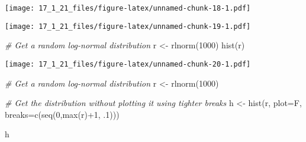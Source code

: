 \documentclass[
]{article}
\newenvironment{Shaded}{\begin{snugshade}}{\end{snugshade}}
\newcommand{\AttributeTok}[1]{\textcolor[rgb]{0.77,0.63,0.00}{#1}}
\newcommand{\CommentTok}[1]{\textcolor[rgb]{0.56,0.35,0.01}{\textit{#1}}}
\newcommand{\DecValTok}[1]{\textcolor[rgb]{0.00,0.00,0.81}{#1}}
\newcommand{\FloatTok}[1]{\textcolor[rgb]{0.00,0.00,0.81}{#1}}
\newcommand{\FunctionTok}[1]{\textcolor[rgb]{0.00,0.00,0.00}{#1}}
\newcommand{\NormalTok}[1]{#1}
\newcommand{\OtherTok}[1]{\textcolor[rgb]{0.56,0.35,0.01}{#1}}
\newcommand{\SpecialCharTok}[1]{\textcolor[rgb]{0.00,0.00,0.00}{#1}}
\newcommand{\StringTok}[1]{\textcolor[rgb]{0.31,0.60,0.02}{#1}}
\begin{document}
\texttt{[image: 17\_1\_21\_files/figure-latex/unnamed-chunk-18-1.pdf]}

\begin{Shaded}
\end{Shaded}

\texttt{[image: 17\_1\_21\_files/figure-latex/unnamed-chunk-19-1.pdf]}

\begin{Shaded}
\begin{Highlighting}[]
\CommentTok{\# Get a random log{-}normal distribution}
\NormalTok{r }\OtherTok{\textless{}{-}} \FunctionTok{rlnorm}\NormalTok{(}\DecValTok{1000}\NormalTok{)}
\FunctionTok{hist}\NormalTok{(r)}
\end{Highlighting}
\end{Shaded}

\texttt{[image: 17\_1\_21\_files/figure-latex/unnamed-chunk-20-1.pdf]}

\begin{Shaded}
\begin{Highlighting}[]
\CommentTok{\# Get a random log{-}normal distribution}
\NormalTok{r }\OtherTok{\textless{}{-}} \FunctionTok{rlnorm}\NormalTok{(}\DecValTok{1000}\NormalTok{)}

\CommentTok{\# Get the distribution without plotting it using tighter breaks}
\NormalTok{h }\OtherTok{\textless{}{-}} \FunctionTok{hist}\NormalTok{(r, }\AttributeTok{plot=}\NormalTok{F, }\AttributeTok{breaks=}\FunctionTok{c}\NormalTok{(}\FunctionTok{seq}\NormalTok{(}\DecValTok{0}\NormalTok{,}\FunctionTok{max}\NormalTok{(r)}\SpecialCharTok{+}\DecValTok{1}\NormalTok{, .}\DecValTok{1}\NormalTok{)))}

\NormalTok{h}
\end{Highlighting}
\end{Shaded}
\end{document}

